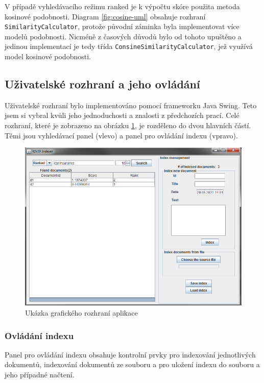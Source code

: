 \documentclass[11pt,a4paper]{scrartcl}
\begin{document}
	V případě vyhledávacího režimu ranked je k výpočtu skóre použita metoda kosinové podobnosti. Diagram \ref{fig:cosine-uml} obsahuje rozhraní \verb|SimilarityCalculator|, protože původní záminka byla implementovat více modelů podobnosti. Nicméně z časových důvodů bylo od tohoto upuštěno a jedinou implementací je tedy třída \verb|ConsineSimilarityCalculator|, jež využívá model kosinové podobnosti. 
	
	\subsection{Uživatelské rozhraní a jeho ovládání}
	
	Uživatelské rozhraní bylo implementováno pomocí frameworku Java Swing. Teto jsem si vybral kvůli jeho jednoduchosti a znalosti z předchozích prací. Celé rozhraní, které je zobrazeno na obrázku \ref{fig:gui-example}, je rozděleno do dvou hlavních částí. Těmi jsou vyhledávací panel (vlevo) a panel pro ovládání indexu (vpravo).
	
	\begin{figure}[!h]
		\centering
		\includegraphics[width=0.9\linewidth]{gui-ranked}
		\caption{Ukázka grafického rozhraní aplikace}
		\label{fig:gui-example}
	\end{figure}

	\subsubsection{Ovládání indexu}
	
	Panel pro ovládání indexu obsahuje kontrolní prvky pro indexování jednotlivých dokumentů, indexování dokumentů ze souboru a pro uložení indexu do souboru a jeho případné načtení.
	
\end{document}
